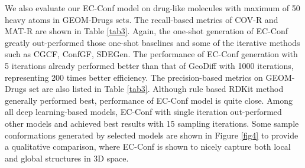 \documentclass{article} %
\begin{document}
We also evaluate our EC-Conf model on drug-like molecules with maximum of 50 heavy atoms in GEOM-Drugs sets. The recall-based metrics of COV-R and MAT-R are shown in Table \ref{tab3}. Again, the one-shot generation of EC-Conf greatly out-performed those one-shot baselines and some of the iterative methods such as CGCF, ConfGF, SDEGen. The performance of EC-Conf generation with 5 iterations already performed better than that of GeoDiff with 1000 iterations, representing 200 times better efficiency. The precision-based metrics on GEOM-Drugs set are also listed in Table \ref{tab3}. Although rule based RDKit method generally performed best, performance of EC-Conf model is quite close. Among all deep learning-based models, EC-Conf with single iteration out-performed other models and achieved best results with 15 sampling iterations. Some sample conformations generated by selected models are shown in Figure \ref{fig4} to provide a qualitative comparison, where EC-Conf is shown to nicely capture both local and global structures in 3D space. 
\end{document}
